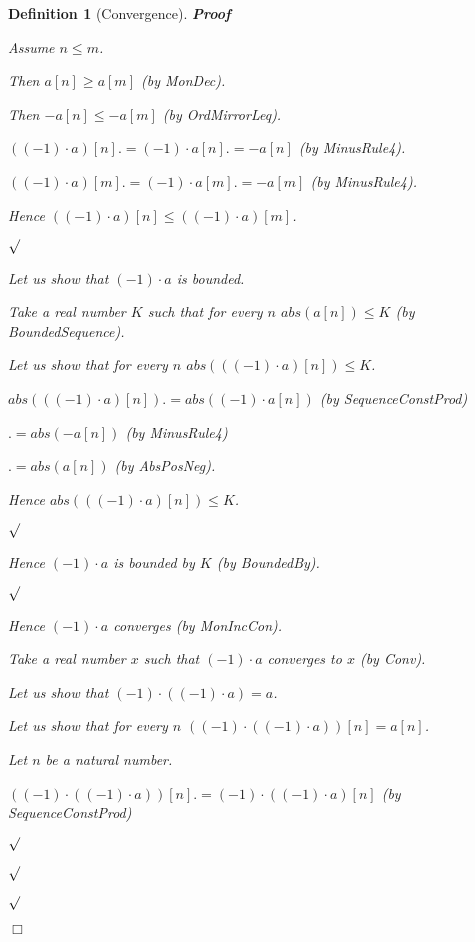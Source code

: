 \documentclass{article}
\newenvironment{forthel}{\begin{leftbar}}{\end{leftbar}}
\newenvironment{proof}{\noindent\textbf{Proof\ }}{\hspace*{\fill}$\Box$\medskip}
\newenvironment{subproof}{\begin{list}{}{}
		\item[\text{Proof}]}{\hfill $\surd$ \end{list}}
\newtheorem{definition}{Definition}
\newcommand{\cdottwo}{\cdot}
\begin{document}
\begin{forthel}
\begin{definition}[Convergence]
\begin{proof}
\begin{subproof}
			\begin{subproof}
				Assume $n \leq m$.
				
				Then $a[n] \geq a[m]$ (by MonDec).
				
				Then $-a[n] \leq -a[m]$ (by OrdMirrorLeq).
				
				$((-1) \cdottwo a)[n] .= (-1) \cdot a[n]
				.= -a[n]$ (by MinusRule4).
				
				$((-1) \cdottwo a)[m] .= (-1) \cdot a[m]
				.= -a[m]$ (by MinusRule4).
				
				Hence $((-1) \cdottwo a)[n] \leq ((-1) \cdottwo a)[m]$.
				
			\end{subproof}
			
			Let us show that $(-1) \cdottwo a$ is bounded.
			
			\begin{subproof}
				Take a real number $K$ such that for every $n$ $abs(a[n]) \leq K$ (by BoundedSequence).
				
				Let us show that for every $n$ $abs(((-1) \cdottwo a)[n]) \leq K$.
				
				\begin{subproof}
					$abs(((-1) \cdottwo a)[n]) .= abs((-1) \cdot a[n])$ (by SequenceConstProd)
					
					$.= abs(-a[n])$ (by MinusRule4)
					
					$.= abs(a[n])$ (by AbsPosNeg).
					
					Hence $abs(((-1) \cdottwo a)[n]) \leq K$.
					
				\end{subproof}
				
				Hence $(-1) \cdottwo a$ is bounded by $K$ (by BoundedBy).
				
			\end{subproof}
			
			Hence $(-1) \cdottwo a$ converges (by MonIncCon).
			
			Take a real number $x$ such that $(-1) \cdottwo a$ converges to $x$ (by Conv).
			
			Let us show that $(-1) \cdottwo ((-1) \cdottwo a) = a$.
			
			\begin{subproof}
				Let us show that for every $n$ $((-1) \cdottwo ((-1) \cdottwo a))[n] = a[n]$.
				
				\begin{subproof}
					Let $n$ be a natural number.
					
					$((-1) \cdottwo ((-1) \cdottwo a))[n] .= (-1) \cdot ((-1) \cdottwo a)[n]$ (by SequenceConstProd)
					

\end{subproof}
\end{subproof}
\end{subproof}
\end{proof}
\end{definition}
\end{forthel}
\end{document}
